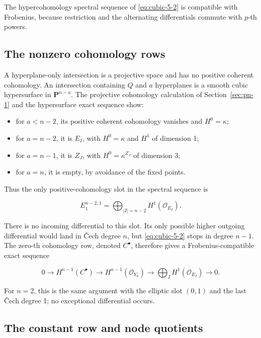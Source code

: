 \documentclass[11pt]{article}
\providecommand{\tightlist}{\setlength{\itemsep}{0pt}\setlength{\parskip}{0pt}}
\begin{document}
The hypercohomology spectral sequence of \eqref{eq:cubic-5-2} is compatible with Frobenius, because restriction and the alternating differentials commute with \(p\)-th powers.

\subsection{The nonzero cohomology rows}\label{sec:cubic-cech-rows}

A hyperplane-only intersection is a projective space and has no positive coherent cohomology. An intersection containing \(Q\) and \(a\) hyperplanes is a smooth cubic hypersurface in \(\mathbf P^{n-a}\). The projective cohomology calculation of Section~\ref{sec:pn-1} and the hypersurface exact sequence show:

\begin{itemize}
\tightlist
\item
  for \(a<n-2\), its positive coherent cohomology vanishes and \(H^0=\kappa\);
\item
  for \(a=n-2\), it is \(E_I\), with \(H^0=\kappa\) and \(H^1\) of dimension 1;
\item
  for \(a=n-1\), it is \(Z_J\), with \(H^0=\kappa^{Z_J}\) of dimension 3;
\item
  for \(a=n\), it is empty, by avoidance of the fixed points.
\end{itemize}

Thus the only positive-cohomology slot in the spectral sequence is

\[
E_1^{n-2,1}=\bigoplus_{|I|=n-2}H^1(\mathcal O_{E_I}).
\]

There is no incoming differential to this slot. Its only possible higher outgoing differential would land in Čech degree \(n\), but \eqref{eq:cubic-5-2} stops in degree \(n-1\). The zero-th cohomology row, denoted \(C^\bullet\), therefore gives a Frobenius-compatible exact sequence

\begin{equation}
0\longrightarrow H^{n-1}(C^\bullet)
\longrightarrow H^{n-1}(\mathcal O_{Y_0})
\longrightarrow\bigoplus_I H^1(\mathcal O_{E_I})
\longrightarrow0.
\label{eq:cubic-5-3}
\end{equation}

For \(n=2\), this is the same argument with the elliptic slot \((0,1)\) and the last Čech degree 1; no exceptional differential occurs.

\subsection{The constant row and node quotients}\label{sec:cubic-cech-quotients}
\end{document}
